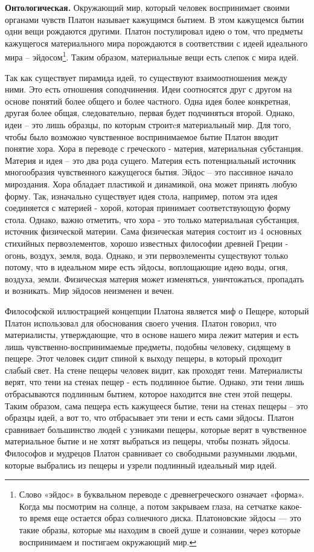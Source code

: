 \documentclass[a4paper, 14pt]{extreport}
\begin{document}
\textbf{Онтологическая.} Окружающий мир, который человек воспринимает
своими органами чувств Платон называет кажущимся бытием. В этом
кажущемся бытии одни вещи рождаются другими. Платон постулировал идею о
том, что предметы кажущегося материального мира порождаются в
соответствии с идеей идеального мира -- эйдосом\footnote{Слово «эйдос» в
  буквальном переводе с древнегреческого означает «форма». Когда мы
  посмотрим на солнце, а потом закрываем глаза, на сетчатке какое-то
  время еще остается образ солнечного диска. Платоновские эйдосы --- это
  такие образы, которые мы находим в своей душе и сознании, через
  которые воспринимаем и постигаем окружающий мир.}. Таким образом,
материальные вещи есть слепок с мира идей.

Так как существует пирамида идей, то существуют взаимоотношения между
ними. Это есть отношения соподчинения. Идеи соотносятся друг с другом на
основе понятий более общего и более частного. Одна идея более
конкретная, другая более общая, следовательно, первая будет подчиняться
второй. Однако, идеи -- это лишь образцы, по которым строитcя
материальный мир. Для того, чтобы было возможно чувственное
воспринимаемое бытие Платон вводит понятие хора. Хора в переводе с
греческого - материя, материальная субстанция. Материя и идея -- это два
рода сущего. Материя есть потенциальный источник многообразия
чувственного кажущегося бытия. Эйдос -- это пассивное начало мироздания.
Хора обладает пластикой и динамикой, она может принять любую форму. Так,
изначально существует идея стола, например, потом эта идея соединяется с
материей - хорой, которая принимает соответствующую форму стола. Однако,
важно отметить, что хора - это только материальная субстанция, источник
физической материи. Сама физическая материя состоит из 4 основных
стихийных первоэлементов, хорошо известных философии древней Греции -
огонь, воздух, земля, вода. Однако, и эти первоэлементы существуют
только потому, что в идеальном мире есть эйдосы, воплощающие идею воды,
огня, воздуха, земли. Физическая материя может изменяться, уничтожаться,
пропадать и возникать. Мир эйдосов неизменен и вечен.

Философской иллюстрацией концепции Платона является миф о Пещере,
который Платон использовал для обоснования своего учения. Платон
говорил, что материалисты, утверждающие, что в основе нашего мира лежит
материя и есть лишь чувственно-воспринимаемые предметы, подобны
человеку, сидящему в пещере. Этот человек сидит спиной к выходу пещеры,
в который проходит слабый свет. На стене пещеры человек видит, как
проходят тени. Материалисты верят, что тени на стенах пещер - есть
подлинное бытие. Однако, эти тени лишь отбрасываются подлинным бытием,
которое находится вне стен этой пещеры. Таким образом, сама пещера есть
кажущееся бытие, тени на стенах пещеры -- это образцы идей, а вот то,
что отбрасывает эти тени и есть сами эйдосы. Платон сравнивает
большинство людей с узниками пещеры, которые верят в чувственное
материальное бытие и не хотят выбраться из пещеры, чтобы познать эйдосы.
Философов и мудрецов Платон сравнивает со свободными разумными людьми,
которые выбрались из пещеры и узрели подлинный идеальный мир идей.
\end{document}
